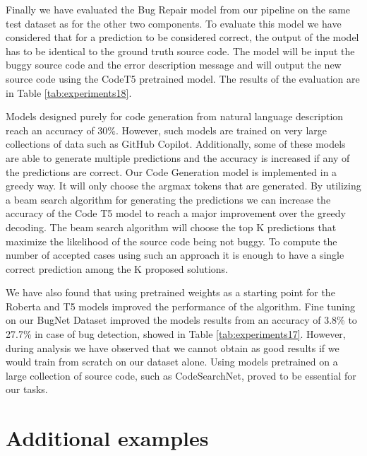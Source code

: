 \documentclass[12pt,a4paper]{report}
\begin{document}
\begin{appendices}
Finally we have evaluated the Bug Repair model from our pipeline on the same test dataset as for the other two components. To evaluate this model we have considered that for a prediction to be considered correct, the output of the model has to be identical to the ground truth source code. The model will be input the buggy source code and the error description message and will output the new source code using the CodeT5 pretrained model. The results of the evaluation are in Table \ref{tab:experiments18}.

Models designed purely for code generation from natural language description reach an accuracy of 30\%. However, such models are trained on very large collections of data such as GitHub Copilot. Additionally, some of these models are able to generate multiple predictions and the accuracy is increased if any of the predictions are correct. Our Code Generation model is implemented in a greedy way. It will only choose the argmax tokens that are generated. By utilizing a beam search algorithm for generating the predictions we can increase the accuracy of the Code T5 model to reach a major improvement over the greedy decoding. The beam search algorithm will choose the top K predictions that maximize the likelihood of the source code being not buggy. To compute the number of accepted cases using such an approach it is enough to have a single correct prediction among the K proposed solutions.

We have also found that using pretrained weights as a starting point for the Roberta and T5 models improved the performance of the algorithm. Fine tuning on our BugNet Dataset improved the models results from an accuracy of 3.8\% to 27.7\% in case of bug detection, showed in Table \ref{tab:experiments17}. However, during analysis we have observed that we cannot obtain as good results if we would train from scratch on our dataset alone. Using models pretrained on a large collection of source code, such as CodeSearchNet, proved to be essential for our tasks.

\chapter{Additional examples}


\end{appendices}
\end{document}
